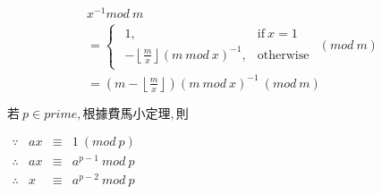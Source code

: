 \[
      \begin{array}{l}
            x^{-1} mod \ m \\
            = \begin{cases}
                  \begin{array}{cl}
                        1, & \text{if} \ x=1 \\
                        -\left \lfloor\frac{m}{x} \right\rfloor(m \ mod \ x)^{-1}, & \text{otherwise}
                  \end{array}
            \end{cases}(mod \ m) \\
            = (m-\left \lfloor\frac{m}{x} \right\rfloor)(m \ mod \ x)^{-1} \ (mod \ m)
      \end{array}
\]

{\raggedright
      \(若 \ p \in prime, 根據費馬小定理, 則 \) \par
      \(
            \begin{array}{rrcl}
                  \because & ax & \equiv & 1 \ (mod \ p) \\
                  \therefore & ax & \equiv & a^{p-1} \ mod \ p \\
                  \therefore & x & \equiv & a^{p-2} \ mod \ p
            \end{array}
      \) \par
}